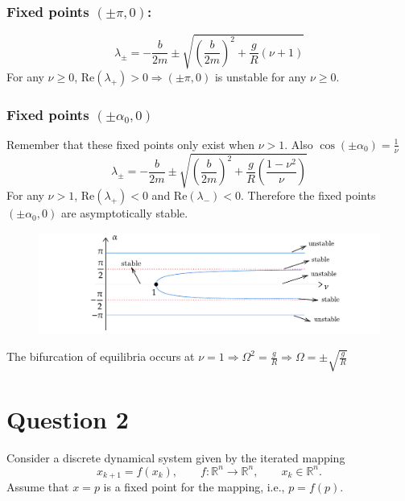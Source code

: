 \documentclass[twoside,10pt,a4paper]{article}
\begin{document}
\begin{enumerate}[label=(\alph*)]
\subsubsection*{Fixed points $(\pm \pi,0)$:}
\begin{equation*}
	\lambda_\pm = -\frac{b}{2m} \pm \sqrt{\left(\frac{b}{2m}\right)^2 + \frac{g}{R}(\nu + 1)}
\end{equation*}
For any $\nu \geq 0$, Re$(\lambda_+)>0 \Longrightarrow (\pm \pi,0)$ is unstable for any $\nu \geq 0$.


\subsubsection*{Fixed points $(\pm \alpha_0,0)$}
Remember that these fixed points only exist when $\nu > 1$. Also $\cos(\pm \alpha_0) = \frac{1}{\nu}$
\begin{equation*}
	\lambda_\pm = -\frac{b}{2m} \pm \sqrt{\left(\frac{b}{2m}\right)^2 + \frac{g}{R}\left( \frac{1-\nu^2}{\nu} \right)}
\end{equation*}
For any $\nu > 1$, Re$(\lambda_+)<0$ and Re$(\lambda_-)<0$. Therefore the fixed points $(\pm \alpha_0,0)$ are asymptotically stable. 

\begin{figure}[H]
	\centering
	\includegraphics[scale=0.9]{Graphics/S01D02.pdf}
\end{figure}

The bifurcation of equilibria occurs at $\nu = 1 \Longrightarrow \Omega^2 = \frac{g}{R} \Longrightarrow \Omega = \pm \sqrt{\frac{g}{R}}$

\end{enumerate}

\newpage

\section*{Question 2}
Consider a discrete dynamical system given by the iterated mapping
\begin{equation*}
	x_{k+1} = f(x_k), \qquad f: \mathbb{R}^n \rightarrow \mathbb{R}^n, \qquad x_k \in \mathbb{R}^n.
\end{equation*}
Assume that $x = p$ is a fixed point for the mapping, i.e., $p = f(p)$.
\end{document}
